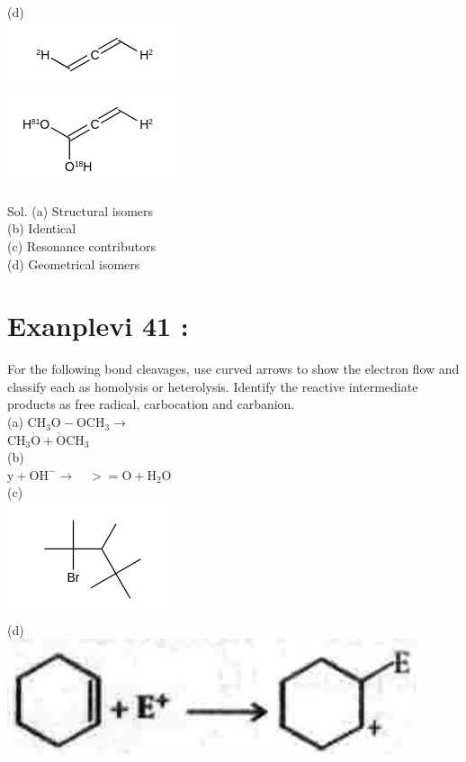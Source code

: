 \documentclass[10pt]{article}
\begin{document}
(d)\\
\includegraphics{smile-fa302a8b6ea9f6221a43135a74b7d4548efb4af1}\\
\includegraphics{smile-8584148751f65d6e9d7375be12b3d0b43188912a}

Sol. (a) Structural isomers\\
(b) Identical\\
(c) Resonance contributors\\
(d) Geometrical isomers

\section*{Exanplevi 41 :}
For the following bond cleavages, use curved arrows to show the electron flow and classify each as homolysis or heterolysis. Identify the reactive intermediate products as free radical, carbocation and carbanion.\\
(a) $\mathrm{CH}_{3} \mathrm{O}-\mathrm{OCH}_{3} \longrightarrow$\\
$\mathrm{CH}_{3} \dot{\mathrm{O}}+\dot{\mathrm{O}} \mathrm{CH}_{3}$\\
(b)\\
$\mathrm{y}+\mathrm{OH}^{-} \longrightarrow \quad>=\mathrm{O}+\mathrm{H}_{2} \mathrm{O}$\\
(c)\\
\includegraphics{smile-0881ab0938201c2e7b4d95a1ee92b538ffd053e5}\\
(d)\\
\includegraphics[max width=\textwidth, center]{2025_01_28_8470952b98110cec3aabg-130(3)}
\end{document}

